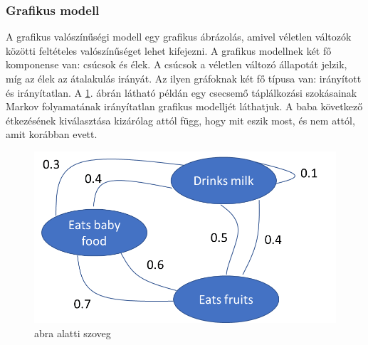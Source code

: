 \subsubsection{Grafikus modell}

A grafikus valószínűségi modell egy grafikus ábrázolás, amivel véletlen változók közötti feltételes valószínűséget lehet kifejezni. A grafikus modellnek két fő komponense van: csúcsok és élek. A csúcsok a véletlen változó állapotát jelzik, míg az élek az átalakulás irányát. Az ilyen gráfoknak két fő típusa van: irányított és irányítatlan. A \ref{fig:graph}. ábrán látható példán egy csecsemő táplálkozási szokásainak Markov folyamatának irányítatlan grafikus modelljét láthatjuk. A baba következő étkezésének kiválasztása kizárólag attól függ, hogy mit eszik most, és nem attól, amit korábban evett.

\begin{figure}[ht]
	\centering
	\includegraphics[width=0.7\columnwidth]{figures/graph_example.png}
	\caption{abra alatti szoveg}
	\label{fig:graph}
\end{figure}





